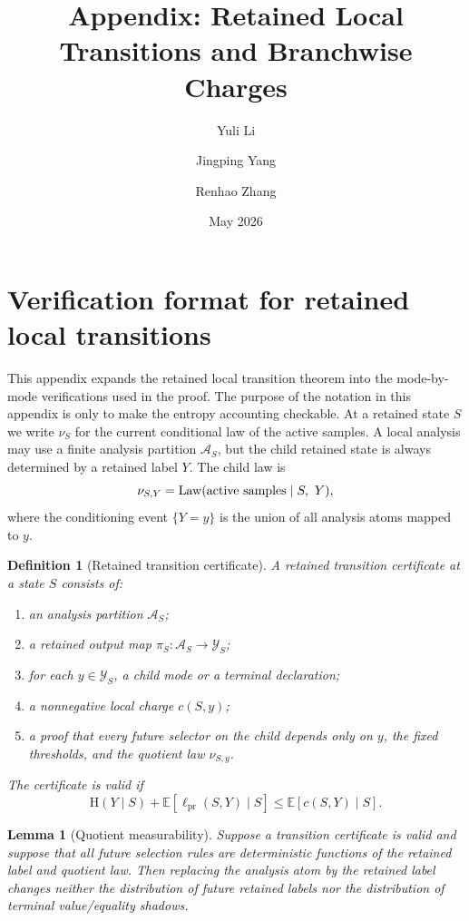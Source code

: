 \documentclass[11pt]{article}
\title{Appendix: Retained Local Transitions and Branchwise Charges}
\author{Yuli Li \and Jingping Yang \and Renhao Zhang}
\date{May 2026}
\newtheorem{lemma}[theorem]{Lemma}
\newtheorem{definition}[theorem]{Definition}
\theoremstyle{remark}
\newcommand{\E}{\mathbb E}
\newcommand{\HH}{\mathrm H}
\newcommand{\Law}{\operatorname{Law}}
\newcommand{\pr}{\mathrm{pr}}
\begin{document}
\maketitle
\appendix

\section{Verification format for retained local transitions}\label{app:verification-format}

This appendix expands the retained local transition theorem into the mode-by-mode verifications used in the proof.  The purpose of the notation in this appendix is only to make the entropy accounting checkable.  At a retained state $S$ we write $\nu_S$ for the current conditional law of the active samples.  A local analysis may use a finite analysis partition $\mathcal A_S$, but the child retained state is always determined by a retained label $Y$.  The child law is
\[
        \nu_{S,Y}=\Law(\hbox{active samples}\mid S,\ Y),
\]
where the conditioning event $\{Y=y\}$ is the union of all analysis atoms mapped to $y$.

\begin{definition}[Retained transition certificate]\label{def:rtc}
A retained transition certificate at a state $S$ consists of:
\begin{enumerate}[label=\textup{(\roman*)}]
\item an analysis partition $\mathcal A_S$;
\item a retained output map $\pi_S:\mathcal A_S\to\mathcal Y_S$;
\item for each $y\in\mathcal Y_S$, a child mode or a terminal declaration;
\item a nonnegative local charge $c(S,y)$;
\item a proof that every future selector on the child depends only on $y$, the fixed thresholds, and the quotient law $\nu_{S,y}$.
\end{enumerate}
The certificate is valid if
\[
        \HH(Y\mid S)+\E[\ell_{\pr}(S,Y)\mid S]\le \E[c(S,Y)\mid S].
\]
\end{definition}

\begin{lemma}[Quotient measurability]\label{lem:quotient-meas-app}
Suppose a transition certificate is valid and suppose that all future selection rules are deterministic functions of the retained label and quotient law.  Then replacing the analysis atom by the retained label changes neither the distribution of future retained labels nor the distribution of terminal value/equality shadows.
\end{lemma}
\end{document}
